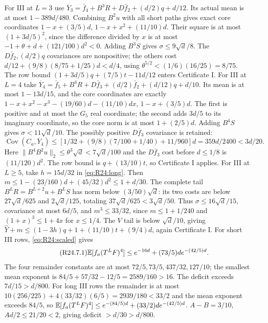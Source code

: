 For III at $L=3$ use
$\overline Y_3=\bar f_4+B^3R+D\bar f_2+(d/2)q+d/12$.
Its actual mean is at most $1-389d/480$.
Combining $B^2u$ with all short paths gives exact core coordinates
$1-x+(3/5)d$, $1-x+x^2+(11/10)d$.
Their square is at most $(1+3d/5)^2$, since the difference divided
by $x$ is at most $-1+\theta+d+(121/100)d^2<0$.
Adding $B^3S$ gives $\sigma\le9\sqrt d/8$.
The $D\bar f_2,(d/2)q$ covariances are nonpositive; the others cost
$d/12+(9/8)(8/75+1/25)d<d/4$,
using $\theta^{5/2}<(1/6)(16/25)=8/75$.
The row bound $(1+3d/5)q+(7/5)t-11d/12$ enters Certificate I.
For III at $L=4$ take
$\overline Y_4=\bar f_5+B^4R+D\bar f_3+(d/2)\bar f_2
+(d/12)q+d/10$.
Its mean is at most $1-13d/15$, and the core coordinates are exactly
$1-x+x^2-x^3-(19/60)d-(11/10)dx$, $1-x+(3/5)d$.
The first is positive and at most the $G_5$ real coordinate;
the second adds $3d/5$ to its imaginary coordinate, so the core norm
is at most $1+(2/5)d$.
Adding $B^4S$ gives $\sigma<11\sqrt d/10$.
The possibly positive $D\bar f_3$ covariance is retained:
\[
\operatorname{Cov}(C_a,\overline Y_4)
\le[1/32+(9/8)(7/100+1/40)+11/960]d
=359d/2400<3d/20.
\]
Here $\|B^4B^2u\|_2\le\theta^3\sqrt d<7\sqrt d/100$ and the
$D\bar f_3$ cost before $d\le1/8$ is $(11/120)d^2$.
The row bound is $q+(13/10)t$, so Certificate I applies.
For III at $L\ge5$, take $h=15d/32$ in \eqref{eq:R24:long}.
Then $m\le1-(23/160)d+(45/32)d^2\le1+d/30$.
The complete tail $B^LR=B^{L+2}u+B^LS$ has norm below
$(3/50)\sqrt d$: its two costs are below
$27\sqrt d/625$ and $2\sqrt d/125$, totaling
$37\sqrt d/625<3\sqrt d/50$.
Thus $\sigma\le16\sqrt d/15$, covariance at most $6d/5$, and
$m^3\le33/32$, since $m\le1+1/240$ and
$(1+x)^3\le1+4x$ for $x\le1/4$.
The $V$ tail is below $\sqrt d/10$, giving
$\widehat Y+m\le(1-3h)q+1+(11/10)t+(9/4)d$, again Certificate I.
For short III rows, \eqref{eq:R24:scaled} gives
\begin{equation}\tag{R24.7.1}\label{eq:R24:IIIshort}
\mathbb E[f_a(T^LF)^4]\le e^{-16d}+(73/5)de^{-(42/5)d}.
\end{equation}
The four remainder constants are at most
$72/5,73/5,437/32,127/10$; the smallest mean exponent is
$84/5+57/32-12/5=2589/160>16$.
The deficit exceeds $7d/15>d/800$.
For long III rows the remainder is at most
$10(256/225)+4(33/32)(6/5)=2939/180<33/2$ and the mean exponent
exceeds $84/5$, so
$\mathbb E[f_a(T^LF)^4]\le e^{-(84/5)d}+(33/2)de^{-(42/5)d}$.
$A-B=3/10$, $Ad/2\le21/20<2$, giving deficit $>d/30>d/800$.

